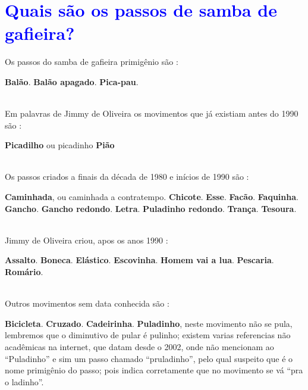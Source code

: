 \section{\textcolor{blue}{Quais são os passos de samba de gafieira?}}

Os passos do samba de gafieira primigênio são \cite[pp. 142]{perna2002samba}:
\begin{tasks}
\task \textbf{Balão}.
\task \textbf{Balão apagado}.
\task \textbf{Pica-pau}. 
\end{tasks}~\\


Em palavras de Jimmy de Oliveira os movimentos que já existiam antes do 1990 são \cite{sambafunkeadoJimmyDeOliveiraPart1}:
\begin{tasks}
\task \textbf{Picadilho} ou picadinho  
\task \textbf{Pião}
\end{tasks}~\\

Os passos criados a finais da década de 1980 e inícios de 1990 são \cite[pp. 143]{perna2002samba}:
\begin{tasks}
\task \textbf{Caminhada}, ou caminhada a contratempo.
\task \textbf{Chicote}.
\task \textbf{Esse}.
\task \textbf{Facão}.
\task \textbf{Faquinha}.
\task \textbf{Gancho}.
\task \textbf{Gancho redondo}.
\task \textbf{Letra}.
\task \textbf{Puladinho redondo}.
\task \textbf{Trança}.
\task \textbf{Tesoura}.
\end{tasks}~\\


Jimmy de Oliveira criou, apos os anos 1990 \cite{sambafunkeadoJimmyDeOliveiraPart1}: 
\begin{tasks}
\task \textbf{Assalto}. 
\task \textbf{Boneca}.
\task \textbf{Elástico}.
\task \textbf{Escovinha}.
\task \textbf{Homem vai a lua}.  
\task \textbf{Pescaria}.
\task \textbf{Romário}.
\end{tasks}~\\



Outros movimentos sem data conhecida são \cite[pp. 143]{perna2002samba}:
\begin{tasks}
\task \textbf{Bicicleta}.
\task \textbf{Cruzado}.
\task \textbf{Cadeirinha}.
\task \textbf{Puladinho}, neste movimento não se pula, lembremos que o diminutivo de pular é pulinho; 
existem varias referencias não acadêmicas na internet, que datam desde o 2002,
onde não mencionam ao ``Puladinho'' e sim um passo chamado ``pruladinho'', pelo qual suspeito que é o nome primigênio do passo;
pois indica corretamente que no movimento se vá ``pra o ladinho''.
\end{tasks}~\\


